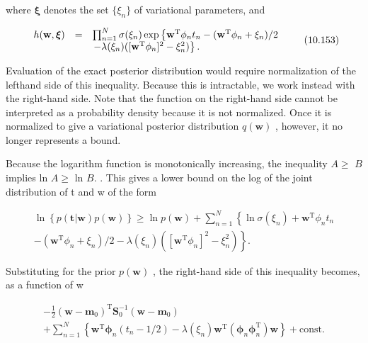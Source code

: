 \documentclass[
  10
]{article}
\begin{document}
where \(\boldsymbol { \xi }\) denotes the set \(\{ \xi _ { n } \}\) of
variational parameters, and

\[
\begin{array}{r c l} h (\mathbf {w}, \boldsymbol {\xi}) & = & \prod_ {n = 1} ^ {N} \sigma (\xi_ {n}) \exp \left\{\mathbf {w} ^ {\mathrm{T}} \phi_ {n} t _ {n} - (\mathbf {w} ^ {\mathrm{T}} \phi_ {n} + \xi_ {n}) / 2 \right. \\ & & \left. - \lambda (\xi_ {n}) ([ \mathbf {w} ^ {\mathrm{T}} \phi_ {n} ] ^ {2} - \xi_ {n} ^ {2}) \right\}. \end{array}\tag{10.153}
\]

Evaluation of the exact posterior distribution would require
normalization of the lefthand side of this inequality. Because this is
intractable, we work instead with the right-hand side. Note that the
function on the right-hand side cannot be interpreted as a probability
density because it is not normalized. Once it is normalized to give a
variational posterior distribution \(q ( \mathbf { w } )\) , however, it
no longer represents a bound.

Because the logarithm function is monotonically increasing, the
inequality \(A \geqslant\) \(B\) implies ln \(A \geqslant\) ln \(B .\) .
This gives a lower bound on the log of the joint distribution of t and w
of the form

\[
\begin{array}{c} \ln \left\{p (\mathbf {t} | \mathbf {w}) p (\mathbf {w}) \right\} \geqslant \ln p (\mathbf {w}) + \sum_ {n = 1} ^ {N} \left\{\ln \sigma (\xi_ {n}) + \mathbf {w} ^ {\mathrm{T}} \phi_ {n} t _ {n} \right. \\ \left. - (\mathbf {w} ^ {\mathrm{T}} \phi_ {n} + \xi_ {n}) / 2 - \lambda (\xi_ {n}) ([ \mathbf {w} ^ {\mathrm{T}} \phi_ {n} ] ^ {2} - \xi_ {n} ^ {2}) \right\}. \end{array}\tag{10.154}
\]

Substituting for the prior \(p ( \mathbf { w } )\) , the right-hand side
of this inequality becomes, as a function of w

\[
\begin{array}{c} {- \frac {1}{2} (\mathbf {w} - \mathbf {m} _ {0}) ^ {\mathrm{T}} \mathbf {S} _ {0} ^ {- 1} (\mathbf {w} - \mathbf {m} _ {0})} \\ {+ \sum_ {n = 1} ^ {N} \left\{\mathbf {w} ^ {\mathrm{T}} \boldsymbol {\phi} _ {n} (t _ {n} - 1 / 2) - \lambda (\xi_ {n}) \mathbf {w} ^ {\mathrm{T}} (\boldsymbol {\phi} _ {n} \boldsymbol {\phi} _ {n} ^ {\mathrm{T}}) \mathbf {w} \right\} + \mathrm{const}.} \end{array}\tag{10.155}
\]
\end{document}

